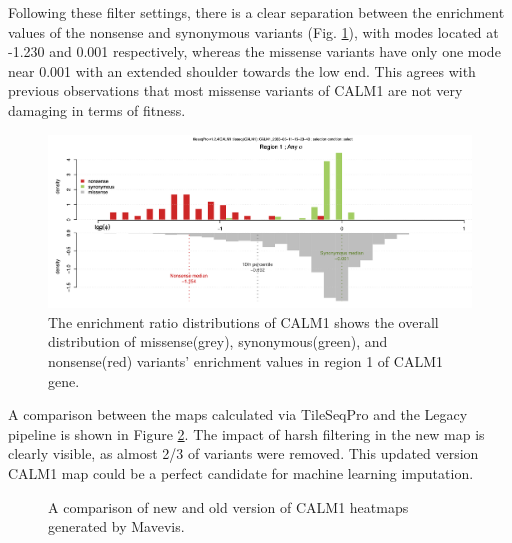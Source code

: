 \documentclass{article}
\begin{document}

Following these filter settings, there is a clear separation between the enrichment values of the nonsense and synonymous variants (Fig. \ref{fig:BCE distribution CALM1}), with modes located at -1.230 and 0.001 respectively, whereas the missense variants have only one mode near 0.001 with an extended shoulder towards the low end. This agrees with previous observations that most missense variants of CALM1 are not very damaging in terms of fitness\cite{weile_framework_2017}.


\begin{figure}[H]
    \centering
    \includegraphics[width =.7\textwidth]{Figures/CALM1/BCE.png}
    \caption{The enrichment ratio distributions of CALM1 shows the overall distribution of missense(grey), synonymous(green), and nonsense(red) variants' enrichment values in region 1 of CALM1 gene. }
    \label{fig:BCE distribution CALM1}
\end{figure}

A comparison between the maps calculated via TileSeqPro and the Legacy pipeline is shown in Figure \ref{fig:final map CALM1}. The impact of harsh filtering in the new map is clearly visible, as almost 2/3 of variants were removed. This updated version CALM1 map could be a perfect candidate for machine learning imputation.

\begin{figure}[H]%
    \centering
    \qquad
    \caption{A comparison of new and old version of CALM1 heatmaps generated by Mavevis.}%
    \label{fig:final map CALM1}%
\end{figure}
\end{document}
